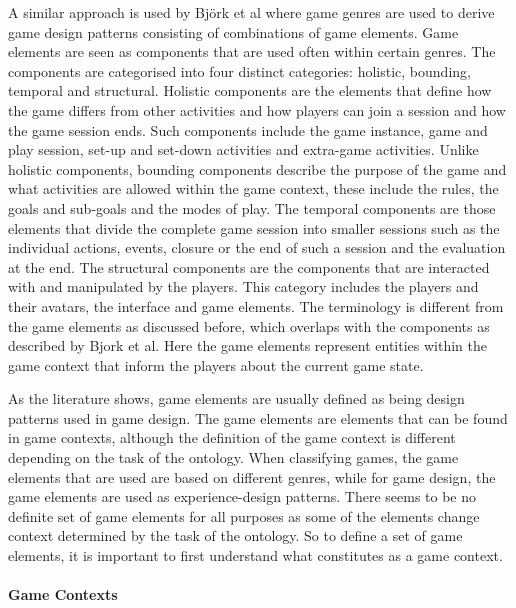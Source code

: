 \documentclass[11pt]{article}
\begin{document}
A similar approach is used by Bj\"ork et al \cite{Bjork2003, Bjork2003b} where game genres are used to derive game design patterns consisting of combinations of game elements. Game elements are seen as components that are used often within certain genres. The components are categorised into four distinct categories: holistic, bounding, temporal and structural. Holistic components are the elements that define how the game differs from other activities and how players can join a session and how the game session ends. Such components include the game instance, game and play session, set-up and set-down activities and extra-game activities. Unlike holistic components, bounding components describe the purpose of the game and what activities are allowed within the game context, these include the rules, the goals and sub-goals and the modes of play. The temporal components are those elements that divide the complete game session into smaller sessions such as the individual actions, events, closure or the end of 
such a session and the evaluation at the end. The structural components are the components that are interacted with and manipulated by the players. This category includes the players and their avatars, the interface and game elements. The terminology is different from the game elements as discussed before, which overlaps with the components as described by Bjork et al. Here the game elements represent entities within the game context that inform the players about the current game state.


As the literature shows, game elements are usually defined as being design patterns used in game design. The game elements are elements that can be found in game contexts, although the definition of the game context is different depending on the task of the ontology. When classifying games, the game elements that are used are based on different genres, while for game design, the game elements are used as experience-design patterns. There seems to be no definite set of game elements for all purposes as some of the elements change context determined by the task of the ontology. So to define a set of game elements, it is important to first understand what constitutes as a game context. 

\paragraph{Game Contexts}
\end{document}
